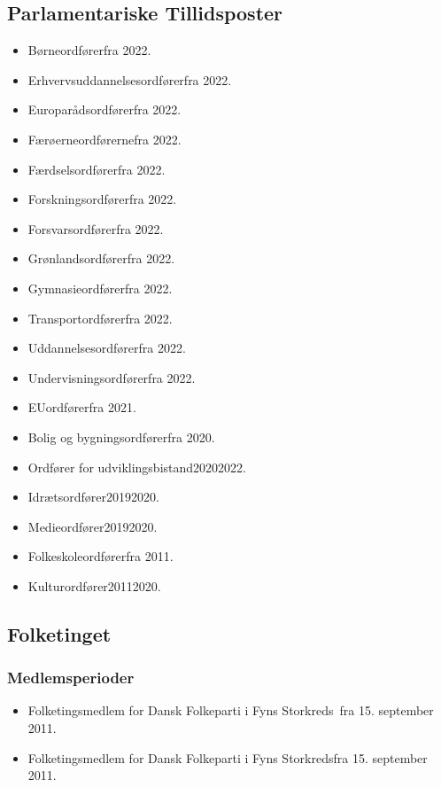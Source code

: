 \documentclass[11pt, a4paper]{awesome-cv}
\begin{document}
\begin{cvletter}
\subsection*{Parlamentariske Tillidsposter}
\begin{itemize}
\item Børneordførerfra 2022.
\item Erhvervsuddannelsesordførerfra 2022.
\item Europarådsordførerfra 2022.
\item Færøerneordførernefra 2022.
\item Færdselsordførerfra 2022.
\item Forskningsordførerfra 2022.
\item Forsvarsordførerfra 2022.
\item Grønlandsordførerfra 2022.
\item Gymnasieordførerfra 2022.
\item Transportordførerfra 2022.
\item Uddannelsesordførerfra 2022.
\item Undervisningsordførerfra 2022.
\item EUordførerfra 2021.
\item Bolig og bygningsordførerfra 2020.
\item Ordfører for udviklingsbistand20202022.
\item Idrætsordfører20192020.
\item Medieordfører20192020.
\item Folkeskoleordførerfra 2011.
\item Kulturordfører20112020.
\end{itemize}
\subsection*{Folketinget}
\subsubsection*{Medlemsperioder}
\begin{itemize}
\item Folketingsmedlem for Dansk Folkeparti i Fyns Storkreds fra 15. september 2011.
\item Folketingsmedlem for Dansk Folkeparti i Fyns Storkredsfra 15. september 2011.
\end{itemize}

\end{cvletter}
\end{document}
